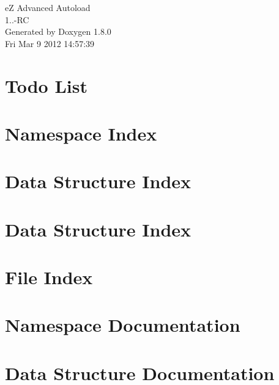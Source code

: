 \documentclass{book}
\begin{document}
\hypersetup{pageanchor=false,citecolor=blue}
\begin{titlepage}
\vspace*{7cm}
\begin{center}
{\Large e\-Z Advanced Autoload \\[1ex]\large 1..-\/\-R\-C }\\
\vspace*{1cm}
{\large Generated by Doxygen 1.8.0}\\
\vspace*{0.5cm}
{\small Fri Mar 9 2012 14:57:39}\\
\end{center}
\end{titlepage}
\clearemptydoublepage
{}
\tableofcontents
\clearemptydoublepage
{}
\hypersetup{pageanchor=true,citecolor=blue}
\chapter{Todo List}
\label{todo}
\hypertarget{todo}{}

\chapter{Namespace Index}

\chapter{Data Structure Index}

\chapter{Data Structure Index}

\chapter{File Index}

\chapter{Namespace Documentation}








\chapter{Data Structure Documentation}





\end{document}
